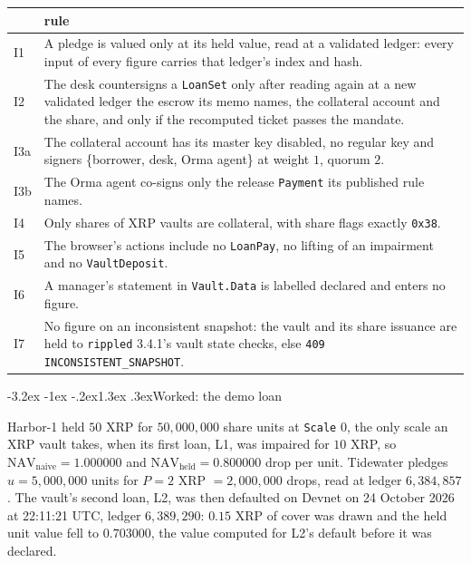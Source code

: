 \documentclass[11pt]{article}
\makeatletter
\renewcommand{\arraystretch}{1.22}
\renewcommand\subsection{\@startsection{subsection}{2}{\z@}%
  {-3.2ex \@plus -1ex \@minus -.2ex}{1.3ex \@plus .3ex}{\normalfont\large\bfseries}}
\theoremstyle{orma}
\theoremstyle{ormaupright}
\makeatother
\begin{document}
\begin{center}
\small
\setlength{\tabcolsep}{6pt}
\renewcommand{\arraystretch}{1.3}
\begin{tabular}{lp{}}
\toprule
 & rule \\
\midrule
I1 & A pledge is valued only at its held value, read at a validated ledger: every input of
every figure carries that ledger's index and hash. \\
I2 & The desk countersigns a \texttt{LoanSet} only after reading again at a new validated
ledger the escrow its memo names, the collateral account and the share, and only if the
recomputed ticket passes the mandate. \\
I3a & The collateral account has its master key disabled, no regular key and signers
\{borrower, desk, Orma agent\} at weight $1$, quorum $2$. \\
I3b & The Orma agent co-signs only the release \texttt{Payment} its published rule names. \\
I4 & Only shares of XRP vaults are collateral, with share flags exactly \texttt{0x38}. \\
I5 & The browser's actions include no \texttt{LoanPay}, no lifting of an impairment and no
\texttt{VaultDeposit}. \\
I6 & A manager's statement in \texttt{Vault.Data} is labelled declared and enters no figure. \\
I7 & No figure on an inconsistent snapshot: the vault and its share issuance are held to
\texttt{rippled} 3.4.1's vault state checks, else \texttt{409 INCONSISTENT\_SNAPSHOT}. \\
\bottomrule
\end{tabular}
\end{center}

\subsection{Worked: the demo loan}

Harbor-1 held $50$ XRP for $50{,}000{,}000$ share units at \texttt{Scale} $0$, the only
scale an XRP vault takes, when its first loan, L1, was impaired for $10$ XRP, so $\mathrm{NAV}_{\mathrm{naive}} = 1.000000$ and
$\mathrm{NAV}_{\mathrm{held}} = 0.800000$ drop per unit. Tidewater pledges
$u = 5{,}000{,}000$ units for $P = 2$ XRP $= 2{,}000{,}000$ drops, read at ledger
$6{,}384{,}857$. The vault's second loan, L2, was then defaulted on Devnet on 24 October 2026
at 22:11:21 UTC, ledger $6{,}389{,}290$: $0.15$ XRP of cover was drawn and the held unit
value fell to $0.703000$, the value computed for L2's default before it was declared.
\end{document}
